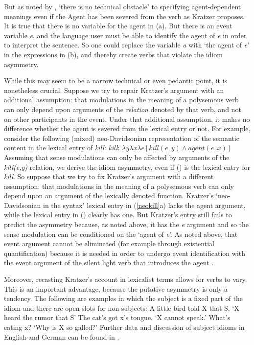 But as noted by \citet{Wechsler2005a}, `there is no technical obstacle' to specifying
agent-dependent meanings even if the Agent has been severed from the verb as Kratzer proposes.  It
is true that there is no variable for the agent in (a).  But there is an event variable
\emph{e}, and the language user must be able to identify the agent of \emph{e} in order to interpret
the sentence.  So one could replace the variable \emph{a} with `the agent of \emph{e}' in the
expressions in (b), and thereby create verbs that violate the idiom asymmetry.

While this may seem to be a narrow technical or even pedantic point, it is nonetheless crucial.  Suppose we try to repair Kratzer's argument with an additional assumption: that modulations in the meaning of a polysemous verb can only depend upon arguments of the \emph{relation} denoted by that verb, and not on other participants in the event.  Under that additional assumption, it makes no difference whether the agent is severed from the lexical entry or not.   For example, consider the following (mixed) neo-Davidsonian representation of the semantic content in the lexical entry of \emph{kill}:    
\ea 
\emph{kill}: $\lambda y\lambda x\lambda e[kill(e,y) \wedge agent(e, x)]$ 
\z
Assuming that sense modulations can only be affected by arguments of the \emph{kill(e,y)} relation,
we derive the idiom asymmetry, even if () is the lexical entry for \emph{kill}.  So suppose
that we try to fix Kratzer's argument with a different assumption: that modulations in the meaning
of a polysemous verb can only depend upon an argument of the lexically denoted function.  Kratzer's
`neo-Davidsonian in the syntax' lexical entry in (\ref{neokill}a) lacks the agent argument, while
the lexical entry in () clearly has one.  But Kratzer's entry still fails to predict the
asymmetry because, as noted above, it has the \emph{e} argument and so the sense modulation can be
conditioned on the `agent of \emph{e}'.  As noted above, that event argument cannot be eliminated
(for example through existential quantification) because it is needed in order to undergo event
identification with the event argument of the silent light verb that introduces the agent
\citet[]{Kratzer96a}.

Moreover, recasting Kratzer's account in lexicalist terms allows for verbs to vary.  This is an important advantage, because the putative asymmetry is only a tendency.  The following are examples in which the subject is a fixed part of the idiom and there are open slots for non-subjects:
\eal
\ex\label{bird}
 A little bird told X that S.
\glt `X heard the rumor that S'   \citep[]{NSW94a} 
\ex\label{cat-tounge}
The cat's got x's tongue.
\glt `X cannot speak.'     \citep[--350]{Bresnan82c}
\ex\label{what-is-eating-x}
What's eating x?
\glt `Why is X so galled?'  \citep[--350]{Bresnan82c}
\zl
Further data and discussion of subject idioms in English and German can be found in .

